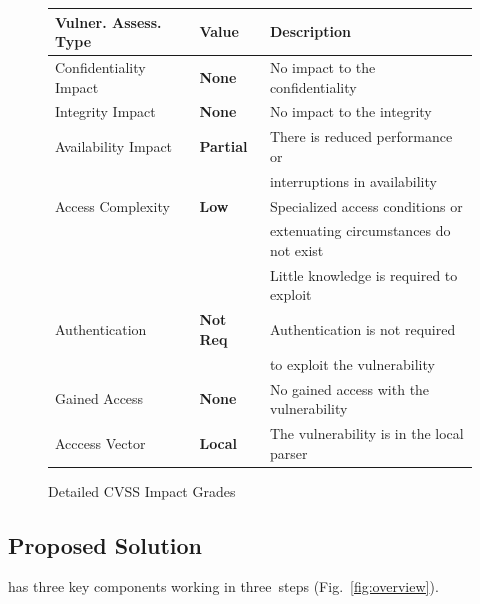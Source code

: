\begin{figure}
\begin{minipage}{0.5\textwidth}
       \begin{flushleft}
  \tabcolsep 3pt
  \scriptsize
  \begin{tabular}{lll}
   Vulner. Assess. Type   & Value & Description \\
      \hline
    Confidentiality Impact & {\bf None}  & No impact to the confidentiality \\
    Integrity Impact & {\bf None}  & No impact to the integrity \\
    Availability Impact & {\bf Partial} & There is reduced performance or\\
    & & interruptions in availability\\
    Access Complexity & {\bf Low} & Specialized access conditions or \\
    & & extenuating circumstances do not exist\\
    & & Little knowledge is required to exploit\\
    Authentication & {\bf Not Req} & Authentication is not required \\
    & & to exploit the vulnerability\\
    Gained Access & {\bf None}  & No gained access with the vulnerability \\
    Acccess Vector & {\bf Local} & The vulnerability is in the local parser \\
  \end{tabular}%
  \end{flushleft}
    \caption{Detailed CVSS Impact Grades}
         \label{cvss}
     \end{minipage}
\end{figure}

\subsection{Proposed Solution}
\label{overview:sec}




\noindent {\tool} has three key components working in three~steps
(Fig.~\ref{fig:overview}).


